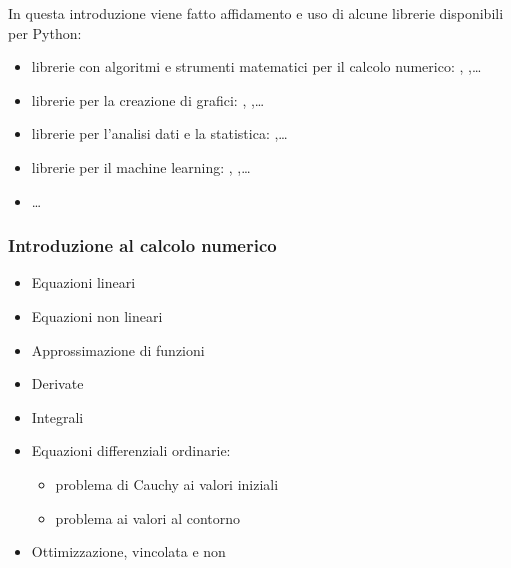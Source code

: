 \documentclass[letterpaper,10pt,english]{jupyterBook}
\begin{document}
\sphinxAtStartPar
In questa introduzione viene fatto affidamento e uso di alcune librerie disponibili per Python:
\begin{itemize}
\item {} 
\sphinxAtStartPar
librerie con algoritmi e strumenti matematici per il calcolo numerico: , ,…

\item {} 
\sphinxAtStartPar
librerie per la creazione di grafici: , ,…

\item {} 
\sphinxAtStartPar
librerie per l’analisi dati e la statistica: ,…

\item {} 
\sphinxAtStartPar
librerie per il machine learning: , ,…

\item {} 
\sphinxAtStartPar
…

\end{itemize}
\subsubsection*{Introduzione al calcolo numerico}
\begin{itemize}
\item {} 
\sphinxAtStartPar
Equazioni lineari

\item {} 
\sphinxAtStartPar
Equazioni non lineari

\item {} 
\sphinxAtStartPar
Approssimazione di funzioni

\item {} 
\sphinxAtStartPar
Derivate

\item {} 
\sphinxAtStartPar
Integrali

\item {} 
\sphinxAtStartPar
Equazioni differenziali ordinarie:
\begin{itemize}
\item {} 
\sphinxAtStartPar
problema di Cauchy ai valori iniziali

\item {} 
\sphinxAtStartPar
problema ai valori al contorno

\end{itemize}

\item {} 
\sphinxAtStartPar
Ottimizzazione, vincolata e non

\end{itemize}
\end{document}
